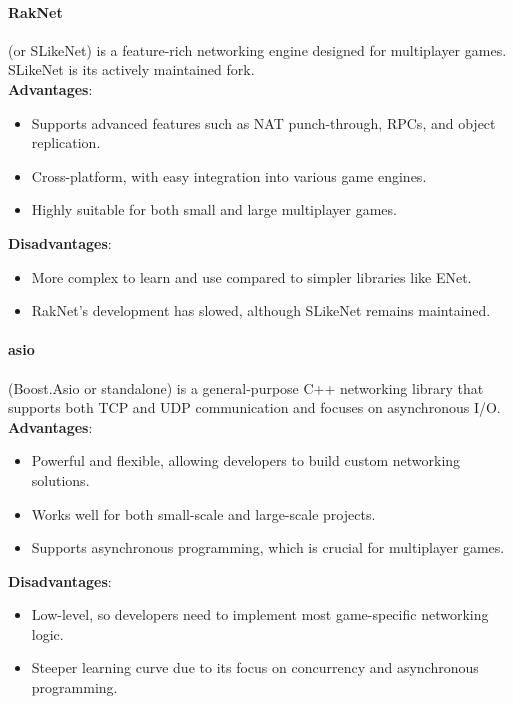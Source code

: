 \documentclass{article} %
\begin{document}
\paragraph{RakNet} (or SLikeNet) is a feature-rich networking engine designed for multiplayer games. SLikeNet is its actively maintained fork.
\\
\textbf{Advantages}:
\begin{itemize}
	\item Supports advanced features such as NAT punch-through, RPCs, and object replication.
	\item Cross-platform, with easy integration into various game engines.
	\item Highly suitable for both small and large multiplayer games.
\end{itemize}
\textbf{Disadvantages}:
\begin{itemize}
	\item More complex to learn and use compared to simpler libraries like ENet.
	\item RakNet’s development has slowed, although SLikeNet remains maintained.
\end{itemize}

\paragraph{asio} (Boost.Asio or standalone) is a general-purpose C++ networking library that supports both TCP and UDP communication and focuses on asynchronous I/O.
\\
\textbf{Advantages}:
\begin{itemize}
	\item Powerful and flexible, allowing developers to build custom networking solutions.
	\item Works well for both small-scale and large-scale projects.
	\item Supports asynchronous programming, which is crucial for multiplayer games.
\end{itemize}
\textbf{Disadvantages}:
\begin{itemize}
	\item Low-level, so developers need to implement most game-specific networking logic.
	\item Steeper learning curve due to its focus on concurrency and asynchronous programming.
\end{itemize}
\end{document}
